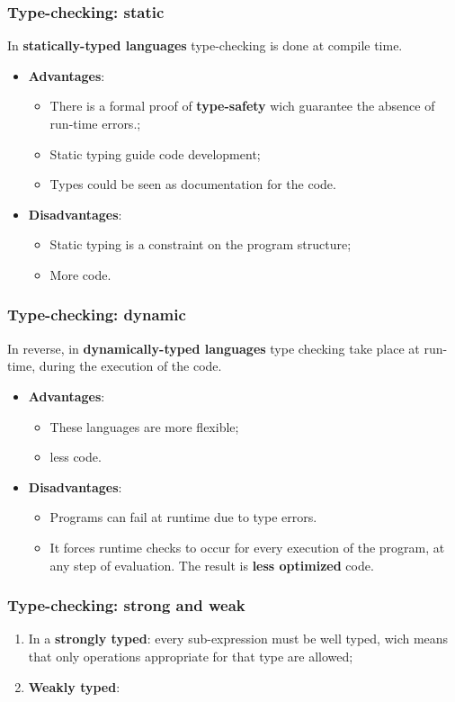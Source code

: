 \documentclass[xcolor ={table,usenames,dvipsnames}]{beamer}
\theoremstyle{definition}
\begin{document}
	\begin{frame}
		\frametitle{Type-checking: static  }
		In \textbf{statically-typed languages} type-checking is done at compile time.
		\begin{itemize}
			\item \textbf{Advantages}:\begin{itemize}
				\item There is a formal proof of \textbf{type-safety} wich guarantee the absence of run-time errors.;
				\item Static typing guide code development;
				\item Types could be seen as documentation for the code.
			\end{itemize}
			\item \textbf{Disadvantages}: 
			\begin{itemize}
				\item Static typing is a constraint on the program structure;
				\item More code.
			\end{itemize}
		\end{itemize}
	\end{frame}

\begin{frame}
	\frametitle{Type-checking: dynamic}
	In reverse, in \textbf{dynamically-typed languages}
	type checking take place at run-time, during the execution of the code.
	\begin{itemize}
		\item \textbf{Advantages}:
		\begin{itemize}
			\item These languages are more flexible;
			\item less code.
		\end{itemize}
		\item \textbf{Disadvantages}:
		\begin{itemize}
			\item Programs can fail at runtime due to type errors.
			\item It forces runtime checks to occur for every execution of the program, at any step of evaluation. The result is \textbf{less optimized} code.
		\end{itemize}
	\end{itemize}
 \end{frame}

\begin{frame}
	\frametitle{Type-checking: strong and weak}
	\begin{enumerate}
		\item In a \textbf{strongly typed}: every sub-expression must be well typed, wich means that only operations appropriate for that type are allowed;
		\item \textbf{Weakly typed}:
	\end{enumerate}
	
\end{frame}
\end{document}
